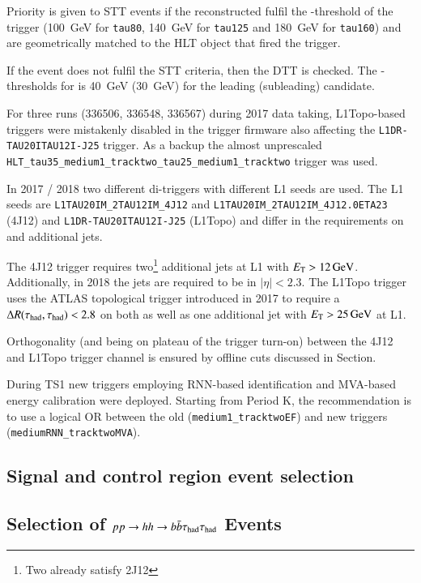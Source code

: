 Priority is given to STT events if the reconstructed \tauhad fulfil the
\pT-threshold of the trigger (\SI{100}{\GeV} for \verb|tau80|, \SI{140}{\GeV}
for \verb|tau125| and \SI{180}{\GeV} for \verb|tau160|) and are geometrically
matched to the HLT object that fired the trigger.

If the event does not fulfil the STT criteria, then the DTT is checked. The
\pT-thresholds for \tauhadvis is \SI{40}{\GeV} (\SI{30}{\GeV}) for the leading
(subleading) \tauhadvis candidate.

For three runs (336506, 336548, 336567) during 2017 data taking, L1Topo-based
triggers were mistakenly disabled in the trigger firmware also affecting the
\verb|L1DR-TAU20ITAU12I-J25| trigger. As a backup the almost unprescaled
\verb|HLT_tau35_medium1_tracktwo_tau25_medium1_tracktwo| trigger was used.

In 2017 / 2018 two different di-\tauhad triggers with different L1 seeds are
used. The L1 seeds are \verb|L1TAU20IM_2TAU12IM_4J12| and
\verb|L1TAU20IM_2TAU12IM_4J12.0ETA23| (4J12) and \verb|L1DR-TAU20ITAU12I-J25|
(L1Topo) and differ in the requirements on \tauhadvis and additional jets.

The 4J12 trigger requires two\footnote{Two \tauhadvis already satisfy 2J12}
additional jets at L1 with $\ET > \SI{12}{\GeV}$. Additionally, in 2018 the jets
are required to be in $|\eta| < 2.3$. The L1Topo trigger uses the ATLAS
topological trigger introduced in 2017 to require a $\Delta R(\tau_{\text{had}}, \tau_{\text{had}})
< 2.8$ on both \tauhad as well as one additional jet with $E_{\text{T}} > \SI{25}{\ensuremath{\text{GeV}}}$
at L1.

Orthogonality (and being on plateau of the trigger turn-on) between the 4J12 and
L1Topo trigger channel is ensured by offline cuts discussed in
Section.%

During TS1 new \tauhadvis triggers employing RNN-based \tauhad identification
and MVA-based energy calibration were deployed. Starting from Period K, the
recommendation is to use a logical OR between the old
(\verb|medium1_tracktwoEF|) and new triggers (\verb|mediumRNN_tracktwoMVA|).


\subsection{Signal and control region event selection}



\subsection{Selection of $pp \rightarrow hh \rightarrow b\bar{b}\tau_{\text{had}}\tau_{\text{had}}$ Events}
\label{sec:reconstruction_of_higgs_candidates}



